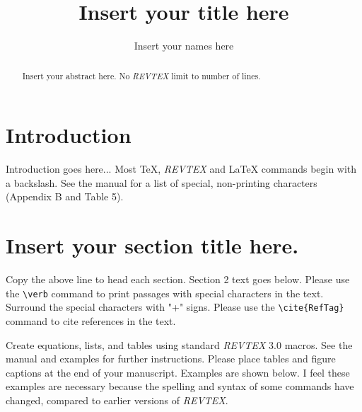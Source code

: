 %
%
%
\newcommand{\MF}{{\large{\manual META}\-{\manual FONT}}}
\newcommand{\manual}{rm}        %
\newcommand\bs{\char '134 }     %
%
%
%
%
%
\title{Insert your title here}
\author{Insert your names here}
\address{Insert the name of your University, company or Institute here}
%
\maketitle
\begin{abstract}                %
 Insert your abstract here.  No {\it REVTEX} limit to number of lines.
\end{abstract}
%
\section{Introduction}               %
Introduction goes here...
 Most TeX, {\it REVTEX} and LaTeX commands begin with a backslash.
 See the manual for a list of special, non-printing characters
 (Appendix B and Table 5).

\section{Insert your section title here.}
 Copy the above line to head each section.  Section 2 text
 goes below.
 Please use the \verb+\verb+ command to print passages with
 special characters in the text.  Surround the special
 characters with "+" signs.
 Please use the \verb+\cite{RefTag}+\cite{RefTag} command to
 cite references in the text.

 Create equations, lists, and tables using standard {\it REVTEX} 3.0
 macros.  See the manual and examples for further instructions.
 Please place tables and figure captions at the end of your
 manuscript.  Examples are shown below.  I feel these examples
 are necessary because the spelling and syntax of some
 commands have changed, compared to earlier versions of {\it REVTEX}.
%





